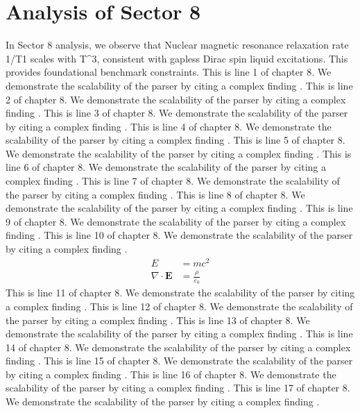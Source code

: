 \chapter{Analysis of Sector 8}

In Sector 8 analysis, we observe that Nuclear magnetic resonance relaxation rate 1/T1 scales with T^3, consistent with gapless Dirac spin liquid excitations. This provides foundational benchmark constraints.
This is line 1 of chapter 8. We demonstrate the scalability of the parser by citing a complex finding \cite{ref8_1}.
This is line 2 of chapter 8. We demonstrate the scalability of the parser by citing a complex finding \cite{ref8_2}.
This is line 3 of chapter 8. We demonstrate the scalability of the parser by citing a complex finding \cite{ref8_3}.
This is line 4 of chapter 8. We demonstrate the scalability of the parser by citing a complex finding \cite{ref8_4}.
This is line 5 of chapter 8. We demonstrate the scalability of the parser by citing a complex finding \cite{ref8_5}.
This is line 6 of chapter 8. We demonstrate the scalability of the parser by citing a complex finding \cite{ref8_6}.
This is line 7 of chapter 8. We demonstrate the scalability of the parser by citing a complex finding \cite{ref8_7}.
This is line 8 of chapter 8. We demonstrate the scalability of the parser by citing a complex finding \cite{ref8_8}.
This is line 9 of chapter 8. We demonstrate the scalability of the parser by citing a complex finding \cite{ref8_9}.
This is line 10 of chapter 8. We demonstrate the scalability of the parser by citing a complex finding \cite{ref8_10}.
\begin{align*}
  E &= mc^2 \\
  \nabla \cdot \mathbf{E} &= \frac{\rho}{\varepsilon_0}
\end{align*}
This is line 11 of chapter 8. We demonstrate the scalability of the parser by citing a complex finding \cite{ref8_11}.
This is line 12 of chapter 8. We demonstrate the scalability of the parser by citing a complex finding \cite{ref8_12}.
This is line 13 of chapter 8. We demonstrate the scalability of the parser by citing a complex finding \cite{ref8_13}.
This is line 14 of chapter 8. We demonstrate the scalability of the parser by citing a complex finding \cite{ref8_14}.
This is line 15 of chapter 8. We demonstrate the scalability of the parser by citing a complex finding \cite{ref8_15}.
This is line 16 of chapter 8. We demonstrate the scalability of the parser by citing a complex finding \cite{ref8_16}.
This is line 17 of chapter 8. We demonstrate the scalability of the parser by citing a complex finding \cite{ref8_17}.
